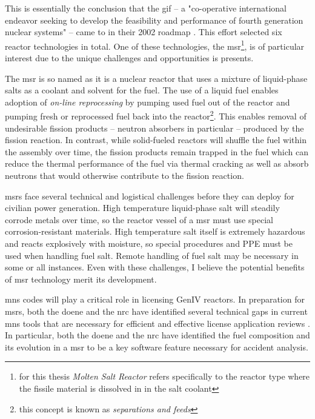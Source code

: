 This is essentially the conclusion that the \Gls{gif} -- a "co-operative international endeavor seeking to develop the feasibility and performance of fourth generation nuclear systems" \cite{gif_homepage} -- came to in their 2002 roadmap \cite{doe-ne_technology_2002}. This effort selected six reactor technologies in total. One of these technologies, the \Gls{msr}\footnote{for this thesis {\it Molten Salt Reactor} refers specifically to the reactor type where the fissile material is dissolved in in the salt
coolant}, is of particular interest due to the unique challenges and opportunities is presents.

The \Gls{msr} is so named as it is a nuclear reactor that uses a mixture of liquid-phase salts as a coolant and solvent for the fuel. The use of a liquid fuel enables adoption of {\it on-line reprocessing} by pumping used fuel out of the reactor and pumping fresh or reprocessed fuel back into the reactor\footnote{this concept is known as {\it separations and feeds}}. This enables removal of undesirable fission products -- neutron absorbers in particular -- produced by the fission reaction. In contrast, while solid-fueled reactors will shuffle
    the fuel within the assembly over time, the fission products remain trapped in the fuel which can reduce the thermal performance of the fuel via thermal cracking as well as absorb neutrons that would otherwise contribute to the fission reaction. 

    \Gls{msr}s face several technical and logistical challenges before they can deploy for civilian power generation. High temperature liquid-phase salt will steadily corrode metals over time, so  the reactor vessel of a \Gls{msr} must use special corrosion-resistant materials. High temperature salt itself is extremely hazardous and reacts explosively with moisture, so special procedures and PPE must be used when handling fuel salt. Remote handling of fuel salt may be necessary in some or all instances. Even with these challenges, I believe the potential benefits of \Gls{msr} technology merit its development.

\Gls{mns} codes will play a critical role in licensing GenIV reactors. In preparation for \Gls{msr}s, both the \Gls{doene} and the \Gls{nrc} have identified several technical gaps in current \Gls{mns} tools that are necessary for efficient and effective license application reviews \cite{betzler_modeling_2019} \cite{usnrc_nonlwr_2020-1}. In particular, both the \Gls{doene} and the \Gls{nrc} have identified the fuel composition and its evolution in a \Gls{msr} to be a key
software feature necessary for accident analysis. 

